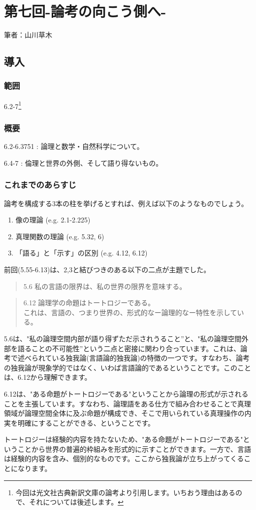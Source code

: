 \documentclass[11pt,a4paper]{jsbook}
\begin{document}
\chapter{第七回-論考の向こう側へ-}

筆者：山川草木

\section{導入}
\subsection*{範囲}
6.2-7\footnote{今回は光文社古典新訳文庫の論考より引用します。いちおう理由はあるので、それについては後述します。}\

\subsection*{概要} 
6.2-6.3751 : 論理と数学・自然科学について。\par
6.4-7 : 倫理と世界の外側、そして語り得ないもの。 

\subsection*{これまでのあらすじ}
論考を構成する3本の柱を挙げるとすれば、例えば以下のようなものでしょう。
\begin{enumerate}
\item 像の理論 (e.g. 2.1-2.225)
\item 真理関数の理論 (e.g. 5.32, 6)
\item 「語る」と「示す」の区別 (e.g. 4.12, 6.12)
\end{enumerate}
\par
前回(5.55-6.13)は、2,3と結びつきのある以下の二点が主題でした。
\begin{quote}
5.6 私の言語の限界は、私の世界の限界を意味する。
\end{quote}
\begin{quote}
6.12 論理学の命題はトートロジーである。\\
これは、言語の、つまり世界の、形式的なー論理的なー特性を示している。
\end{quote}
\par
5.6は、"私の論理空間内部が語り得ずただ示されうること”と、"私の論理空間外部を語ることの不可能性”という二点と密接に関わり合っています。これは、論考で述べられている独我論(言語論的独我論)の特徴の一つです。すなわち、論考の独我論が現象学的ではなく、いわば言語論的であるということです。このことは、6.12から理解できます。
\par
6.12は、"ある命題がトートロジーである"ということから論理の形式が示されることを主張しています。すなわち、論理語をある仕方で組み合わせることで真理領域が論理空間全体に及ぶ命題が構成でき、そこで用いられている真理操作の内実を明確にすることができる、ということです。 
\par
トートロジーは経験的内容を持たないため、"ある命題がトートロジーである"ということから世界の普遍的枠組みを形式的に示すことができます。一方で、言語は経験的内容を含み、個別的なものです。ここから独我論が立ち上がってくることになります。 
\end{document}
